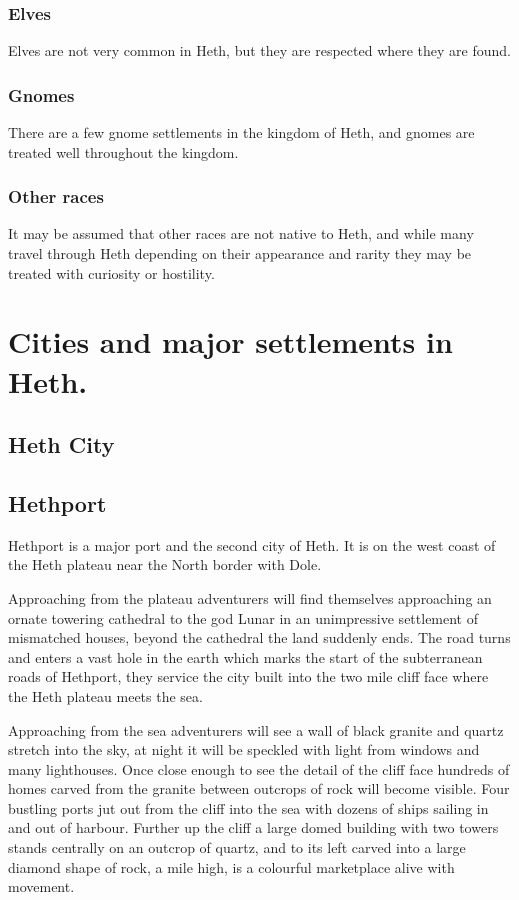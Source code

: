 \documentclass[10pt,twoside,twocolumn,openany,justified,bg=full,nomultitoc]{dndbook}
\begin{document}
\subsubsection{Elves}
\label{sec-2-2-3-3}
Elves are not very common in Heth, but they are respected where they are found.  

\subsubsection{Gnomes}
\label{sec-2-2-3-4}
There are a few gnome settlements in the kingdom of Heth, and gnomes are treated well throughout the kingdom. 

\subsubsection{Other races}
\label{sec-2-2-3-5}
It may be assumed that other races are not native to Heth, and while many travel through Heth depending on their appearance and rarity they may be treated with curiosity or hostility.

\section{Cities and major settlements in Heth.}
\label{sec-2-3}
\subsection{Heth City}
\label{sec-2-3-1}

\subsection{Hethport}
\label{sec-2-3-2}
Hethport is a major port  and the second city of Heth. It is on the west coast of the Heth plateau near the North border with Dole. 

\begin{commentbox}{}Approaching from the plateau adventurers will find themselves approaching an ornate towering cathedral to the god Lunar in an unimpressive settlement of mismatched houses, beyond the cathedral the land suddenly ends. The road turns and enters a vast hole in the earth which marks the start of the subterranean roads of Hethport, they service the city built into the two mile cliff face where the Heth plateau meets the sea. 

Approaching from the sea adventurers will see a wall of black granite and quartz stretch into the sky, at night it will be speckled with light from windows and many lighthouses. Once close enough to see the detail of the cliff face hundreds of homes carved from the granite between outcrops of rock will become visible. Four bustling ports jut out from the cliff into the sea with dozens of ships sailing in and out of harbour. Further up the cliff a large domed building with two towers stands centrally on an outcrop of quartz, and to its left carved into a large diamond shape of rock, a mile high, is a colourful marketplace alive with movement. 
\end{commentbox}
\end{document}

